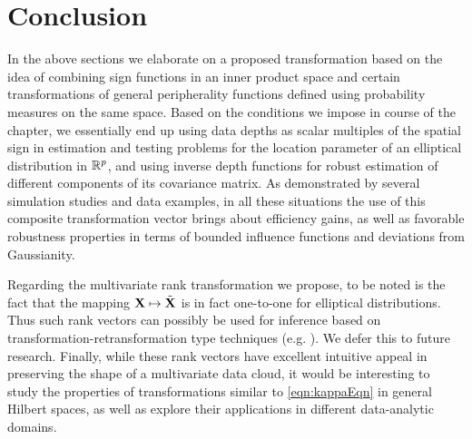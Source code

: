 \section{Conclusion}\label{section:sec7}
\label{section:Conclusion}
In the above sections we elaborate on a proposed transformation based on the idea of combining sign functions in an inner product space and certain transformations of general peripherality functions defined using probability measures on the same space. Based on the conditions we impose in course of the chapter, we essentially end up using data depths as scalar multiples of the spatial sign in estimation and testing problems for the location parameter of an elliptical distribution in ${\mathbb{R}}^p$, and using inverse depth functions for robust estimation of different components of its covariance matrix. As demonstrated by several simulation studies and data examples, in all these situations the use of this composite transformation vector brings about efficiency gains, as well as favorable robustness properties in terms of bounded influence functions and deviations from Gaussianity.

Regarding the multivariate rank transformation we propose, to be noted is the fact that the mapping ${\mathbf{X}} \mapsto \tilde {{\mathbf{X}}}$ is in fact one-to-one for elliptical distributions. Thus such rank vectors can possibly be used for inference based on transformation-retransformation type techniques (e.g. \cite{ChakrabortyChaudhuri96,ChakrabortyChaudhuriOja98}). We defer this to future research. Finally, while these rank vectors have excellent intuitive appeal in preserving the shape of a multivariate data cloud, it would be interesting to study the properties of transformations similar to \ref{eqn:kappaEqn} in general Hilbert spaces, as well as explore their applications in different data-analytic domains.
